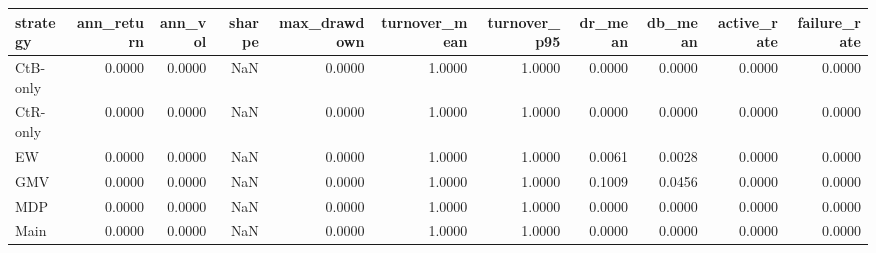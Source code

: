 \begin{tabular}{lrrrrrrrrrr}
\toprule
strategy & ann_return & ann_vol & sharpe & max_drawdown & turnover_mean & turnover_p95 & dr_mean & db_mean & active_rate & failure_rate \\
\midrule
CtB-only & 0.0000 & 0.0000 & NaN & 0.0000 & 1.0000 & 1.0000 & 0.0000 & 0.0000 & 0.0000 & 0.0000 \\
CtR-only & 0.0000 & 0.0000 & NaN & 0.0000 & 1.0000 & 1.0000 & 0.0000 & 0.0000 & 0.0000 & 0.0000 \\
EW & 0.0000 & 0.0000 & NaN & 0.0000 & 1.0000 & 1.0000 & 0.0061 & 0.0028 & 0.0000 & 0.0000 \\
GMV & 0.0000 & 0.0000 & NaN & 0.0000 & 1.0000 & 1.0000 & 0.1009 & 0.0456 & 0.0000 & 0.0000 \\
MDP & 0.0000 & 0.0000 & NaN & 0.0000 & 1.0000 & 1.0000 & 0.0000 & 0.0000 & 0.0000 & 0.0000 \\
Main & 0.0000 & 0.0000 & NaN & 0.0000 & 1.0000 & 1.0000 & 0.0000 & 0.0000 & 0.0000 & 0.0000 \\
\bottomrule
\end{tabular}
